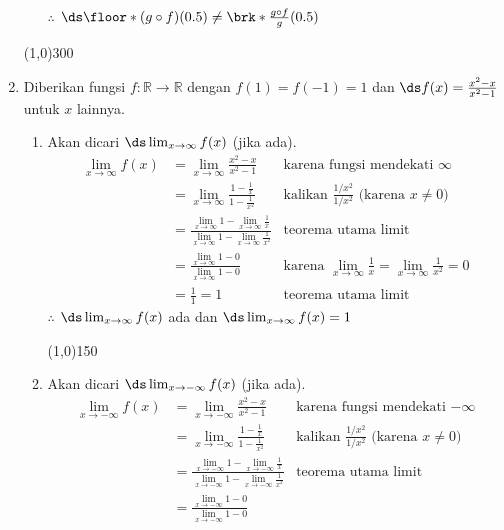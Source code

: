 \begin{enumerate}[leftmargin=*, label={\arabic*}.]
\begin{enumerate}[label={\alph*}.]
$\therefore$ 
$\ds \floor*{(g \circ f)(0.5)} \neq \brk*{\frac{g \circ f}{g}}(0.5)$
\end{enumerate}
\begin{center}
    \line(1,0){300}
\end{center}
\item Diberikan fungsi $f\colon \mathbb{R} \to \mathbb{R}$ dengan $f(1)=f(-1)=1$ 
dan $\ds f(x) = \frac{x^{2}-x}{x^{2}-1}$ untuk $x$ lainnya.
\begin{enumerate}[label={\alph*}.]
    \item Akan dicari $\ds \lim_{x \to \infty} f(x)$ (jika ada).
    \begin{align*}
        \lim_{x \to \infty} f(x) 
        &= \lim_{x \to \infty} \frac{x^{2}-x}{x^{2}-1}
        &\text{karena fungsi mendekati $\infty$}\\
        &= \lim_{x \to \infty} \frac{1-\frac{1}{x}}{1-\frac{1}{x^{2}}}
        &\text{kalikan $\frac{1/x^{2}}{1/x^{2}}$ (karena $x \neq 0$)}\\
        &=\frac{\lim_{x \to \infty} 1 - \lim_{x \to \infty} \frac{1}{x}}
        {\lim_{x \to \infty} 1 - \lim_{x \to \infty}\frac{1}{x^{2}}}
        &\text{teorema utama limit}\\
        &= \frac{\lim_{x \to \infty} 1 - 0}{\lim_{x \to \infty} 1 - 0}
        &\text{karena $\lim_{x\to\infty}\frac{1}{x} = \lim_{x\to\infty}\frac{1}{x^{2}} = 0$}\\
        &= \frac{1}{1} = 1
        &\text{teorema utama limit}
    \end{align*} 
    $\therefore$ $\ds \lim_{x \to \infty} f(x)$ ada dan 
    $\ds \lim_{x \to \infty} f(x) = 1$
\begin{center}
    \line(1,0){150}
\end{center}
    \item Akan dicari $\ds \lim_{x \to -\infty} f(x)$ (jika ada).
    \begin{align*}
        \lim_{x \to -\infty} f(x) 
        &= \lim_{x \to -\infty} \frac{x^{2}-x}{x^{2}-1}
        &\text{karena fungsi mendekati $-\infty$}\\
        &= \lim_{x \to -\infty} \frac{1-\frac{1}{x}}{1-\frac{1}{x^{2}}}
        &\text{kalikan $\frac{1/x^{2}}{1/x^{2}}$ (karena $x \neq 0$)}\\
        &=\frac{\lim_{x \to -\infty} 1 - \lim_{x \to -\infty} \frac{1}{x}}
        {\lim_{x \to- \infty} 1 - \lim_{x \to -\infty}\frac{1}{x^{2}}}
        &\text{teorema utama limit}\\
        &= \frac{\lim_{x \to -\infty} 1 - 0}{\lim_{x \to -\infty} 1 - 0}

\end{align*}
\end{enumerate}
\end{enumerate}
